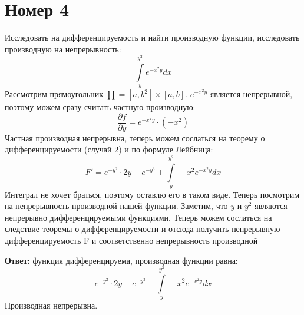 \documentclass[a4paper,12pt]{article}
\begin{document}
\section*{Номер 4}
Исследовать на дифференцируемость и найти производную функции, исследовать производную на непрерывность:
\[
\int\limits_y^{y^2} e^{-x^2y} dx
\]
Рассмотрим прямоугольник $\prod = [a, b^2] \times [a, b]$. $e^{-x^2y}$ является непрерывной, поэтому можем сразу считать частную производную:
\[
\frac{\partial f}{\partial y}  =  e^{-x^2 y} \cdot (-x^2)
\]
Частная производная непрерывна, теперь можем сослаться на теорему о дифференцируемости (случай 2) и по формуле Лейбница:
\[
F' = e^{-y^2} \cdot 2y - e^{-y^3} + \int\limits_y^{y^2} -x^2 e^{-x^2y} dx
\]
Интеграл не хочет браться, поэтому оставлю его в таком виде. Теперь посмотрим на непрерывность производной нашей функции. Заметим, что $y$ и $y^2$ являются непрерывно дифференцируемыми функциями. Теперь можем сослаться на следствие теоремы о дифференцируемости и отсюда получить непрерывную дифференцируемость F и соответственно непрерывность производной
\begin{center}
\textbf{Ответ: } функция дифференцируема, производная функции равна:
\[
e^{-y^2} \cdot 2y - e^{-y^3} + \int\limits_y^{y^2} -x^2 e^{-x^2y} dx
\]
Производная непрерывна.
\end{center}
\clearpage
\end{document}
